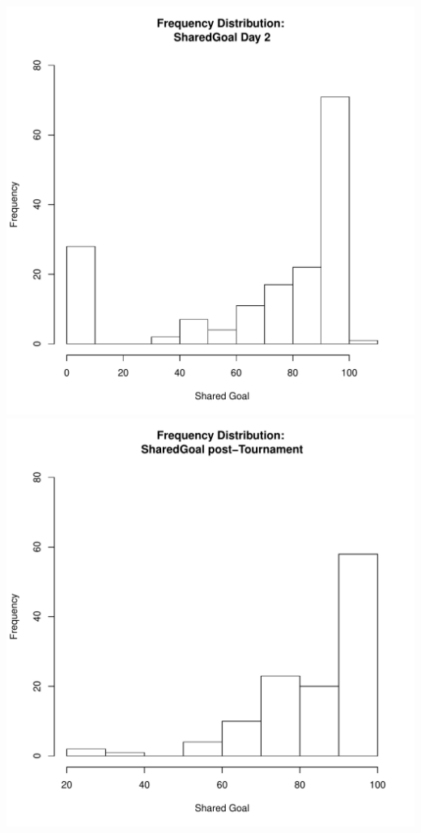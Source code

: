 \documentclass[12pt]{report}
\begin{document}
\includegraphics[scale =.4]{../images/distSharedGoalDay2.pdf}
\includegraphics[scale =.4]{../images/distSharedGoalPost.pdf}
\end{document}
